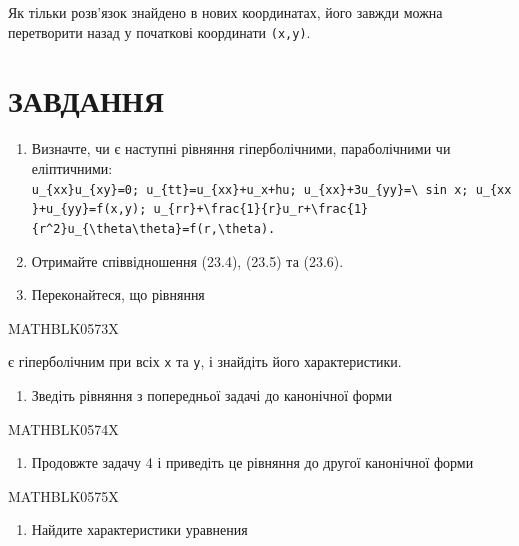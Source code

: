 \documentclass[
  ukrainian,
]{article}
\providecommand{\tightlist}{%
  \setlength{\itemsep}{0pt}\setlength{\parskip}{0pt}}
\begin{document}
Як тільки розв'язок знайдено в нових координатах, його завжди можна
перетворити назад у початкові координати \texttt{(x,y)}.

\section{ЗАВДАННЯ}\label{ux437ux430ux432ux434ux430ux43dux43dux44f-3}

\begin{enumerate}
\def\labelenumi{\arabic{enumi}.}
\item
  Визначте, чи є наступні рівняння гіперболічними, параболічними чи
  еліптичними:
  \texttt{\textquotesingle{}u\_\{xx\}u\_\{xy\}=0\textquotesingle{};\ \textquotesingle{}u\_\{tt\}=u\_\{xx\}+u\_x+hu\textquotesingle{};\ \textquotesingle{}u\_\{xx\}+3u\_\{yy\}=\textbackslash{}\ sin\ x\textquotesingle{};\ \textquotesingle{}u\_\{xx\}+u\_\{yy\}=f(x,y)\textquotesingle{};\ \textquotesingle{}u\_\{rr\}+\textbackslash{}frac\{1\}\{r\}u\_r+\textbackslash{}frac\{1\}\{r\^{}2\}u\_\{\textbackslash{}theta\textbackslash{}theta\}=f(r,\textbackslash{}theta)\textquotesingle{}.}
\item
  Отримайте співвідношення (23.4), (23.5) та (23.6).
\item
  Переконайтеся, що рівняння
\end{enumerate}

MATHBLK0573X

є гіперболічним при всіх \texttt{x} та \texttt{y}, і знайдіть його
характеристики.

\begin{enumerate}
\def\labelenumi{\arabic{enumi}.}
\setcounter{enumi}{3}
\tightlist
\item
  Зведіть рівняння з попередньої задачі до канонічної форми
\end{enumerate}

MATHBLK0574X

\begin{enumerate}
\def\labelenumi{\arabic{enumi}.}
\setcounter{enumi}{4}
\tightlist
\item
  Продовжте задачу 4 і приведіть це рівняння до другої канонічної форми
\end{enumerate}

MATHBLK0575X

\begin{enumerate}
\def\labelenumi{\arabic{enumi}.}
\setcounter{enumi}{5}
\tightlist
\item
  Найдите характеристики уравнения
\end{enumerate}
\end{document}
